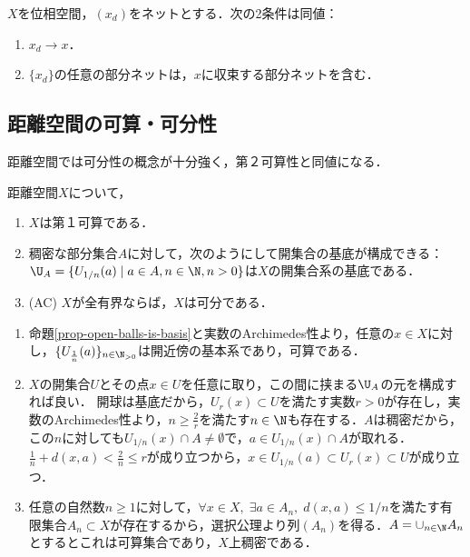 \documentclass[uplatex,dvipdfmx]{jsreport}
\begin{document}
\begin{theorem}
    $X$を位相空間，$(x_d)$をネットとする．次の2条件は同値：
    \begin{enumerate}
        \item $x_d\to x$．
        \item $\{x_d\}$の任意の部分ネットは，$x$に収束する部分ネットを含む．
    \end{enumerate}
\end{theorem}

\subsection{距離空間の可算・可分性}

\begin{tcolorbox}[colframe=ForestGreen, colback=ForestGreen!10!white,breakable,colbacktitle=ForestGreen!40!white,coltitle=black,fonttitle=\bfseries\sffamily,
title=]
    距離空間では可分性の概念が十分強く，第２可算性と同値になる．
\end{tcolorbox}

\begin{proposition}[距離空間では全有界なら可分]\label{prop-sep-metric-space}
    距離空間$X$について，
    \begin{enumerate}
        \item $X$は第１可算である．
        \item 稠密な部分集合$A$に対して，次のようにして開集合の基底が構成できる：$\U_A=\{U_{1/n}(a)\mid a\in A,n\in\N,n>0\}$は$X$の開集合系の基底である．
        \item (AC) $X$が全有界ならば，$X$は可分である．
    \end{enumerate}
\end{proposition}
\begin{Proof}\mbox{}
    \begin{enumerate}
        \item 命題\ref{prop-open-balls-is-basis}と実数のArchimedes性より，任意の$x\in X$に対し，$\{U_{\frac{1}{n}}(a)\}_{n\in\N_{>0}}$は開近傍の基本系であり，可算である．
        \item $X$の開集合$U$とその点$x\in U$を任意に取り，この間に挟まる$\U_A$の元を構成すれば良い．
        開球は基底だから，$U_r(x)\subset U$を満たす実数$r>0$が存在し，実数のArchimedes性より，$n\ge\frac{2}{r}$を満たす$n\in\N$も存在する．$A$は稠密だから，この$n$に対しても$U_{1/n}(x)\cap A\ne\emptyset$で，$a\in U_{1/n}(x)\cap A$が取れる．
        $\frac{1}{n}+d(x,a)<\frac{2}{n}\le r$が成り立つから，$x\in U_{1/n}(a)\subset U_r(x)\subset U$が成り立つ．
        \item 
        任意の自然数$n\ge 1$に対して，$\forall x\in X,\;\exists a\in A_n,\;d(x,a)\le 1/n$を満たす有限集合$A_n\subset X$が存在するから，選択公理より列$(A_n)$を得る．$A=\cup_{n\in\N}A_n$とするとこれは可算集合であり，$X$上稠密である．
    \end{enumerate}
\end{Proof}
\end{document}
